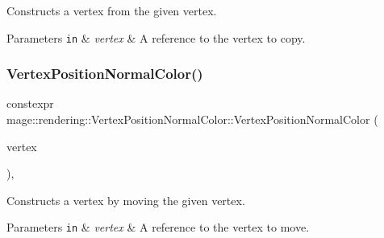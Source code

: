 Constructs a vertex from the given vertex.


\begin{DoxyParams}[1]{Parameters}
\mbox{\tt in}  & {\em vertex} & A reference to the vertex to copy. \\
\hline
\end{DoxyParams}
\hypertarget{structmage_1_1rendering_1_1_vertex_position_normal_color_ac6247b996c107e6daa2204f98d38b2a9}{}\label{structmage_1_1rendering_1_1_vertex_position_normal_color_ac6247b996c107e6daa2204f98d38b2a9} 
\subsubsection{\texorpdfstring{Vertex\+Position\+Normal\+Color()}{VertexPositionNormalColor()}\hspace{0.1cm}{\footnotesize\ttfamily [4/4]}}
{\footnotesize\ttfamily constexpr mage\+::rendering\+::\+Vertex\+Position\+Normal\+Color\+::\+Vertex\+Position\+Normal\+Color (\begin{DoxyParamCaption}\item[{\hyperlink{structmage_1_1rendering_1_1_vertex_position_normal_color}{Vertex\+Position\+Normal\+Color} \&\&}]{vertex }\end{DoxyParamCaption})\hspace{0.3cm}{\ttfamily [default]}, {\ttfamily [noexcept]}}

Constructs a vertex by moving the given vertex.


\begin{DoxyParams}[1]{Parameters}
\mbox{\tt in}  & {\em vertex} & A reference to the vertex to move. \\
\hline
\end{DoxyParams}
\hypertarget{structmage_1_1rendering_1_1_vertex_position_normal_color_af78e3787e0971664a9114cdf4335101c}{}\label{structmage_1_1rendering_1_1_vertex_position_normal_color_af78e3787e0971664a9114cdf4335101c} 
